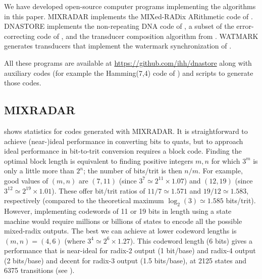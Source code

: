 \documentclass[english]{article}
\begin{document}
We have developed open-source computer programs implementing the algorithms in this paper.
MIXRADAR implements the MIXed-RADix ARithmetic code of .
DNASTORE implements the non-repeating DNA code of ,
a subset of the error-correcting code of ,
and the transducer composition algorithm from .
WATMARK generates transducers that implement the watermark synchronization of .

All these programs are available at \url{https://github.com/ihh/dnastore}
along with auxiliary codes (for example the Hamming(7,4) code of )
and scripts to generate those codes.

\subsection{MIXRADAR}

 shows statistics for codes generated with MIXRADAR.
It is straightforward to achieve (near-)ideal performance in converting bits to quats,
but to approach ideal performance in bit-to-trit conversion requires a block code.
Finding the optimal block length is equivalent to finding
positive integers $m,n$ for which $3^m$ is only a little more than $2^n$;
the number of bits/trit is then $n/m$.
For example, good values of $(m,n)$ are $(7,11)$
(since $3^7 \simeq 2^{11} \times 1.07$)
and $(12,19)$ (since $3^{12} \simeq 2^{19} \times 1.01$).
These offer bit/trit ratios of $11/7 \simeq 1.571$ and $19/12 \simeq 1.583$, respectively
(compared to the theoretical maximum $\log_2(3) \simeq 1.585$ bits/trit).
However, implementing codewords of 11 or 19 bits in length using a state machine
would require millions or billions of states
to encode all the possible mixed-radix outputs.
The best we can achieve at lower codeword lengths is $(m,n) = (4,6)$ (where $3^4 \simeq 2^6 \times 1.27$).
This codeword length (6 bits) gives a performance that is near-ideal for radix-2 output (1 bit/base) and radix-4 output (2 bits/base)
and decent for radix-3 output (1.5 bits/base), at 2125 states and 6375 transitions (see ).

%

\end{document}
